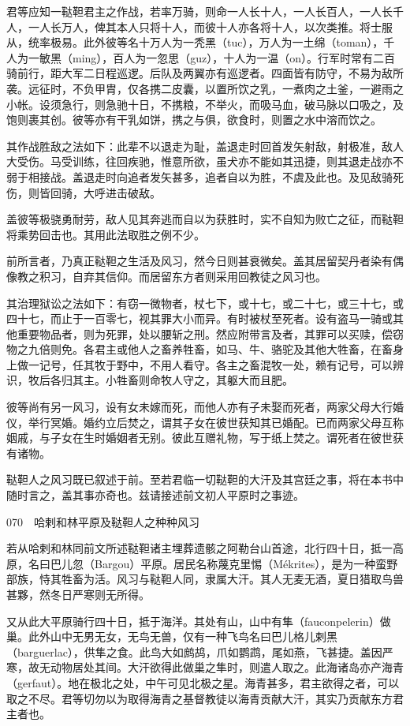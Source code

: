 \documentclass[12pt,UTF8]{ctexbook}
\begin{document}
君等应知一鞑靼君主之作战，若率万骑，则命一人长十人，一人长百人，一人长千人，一人长万人，俾其本人只将十人，而彼十人亦各将十人，以次类推。将士服从，统率极易。此外彼等名十万人为一秃黑（tuc），万人为一土绵（toman），千人为一敏黑（ming），百人为一忽思（guz），十人为一温（on）。行军时常有二百骑前行，距大军二日程巡逻。后队及两翼亦有巡逻者。四面皆有防守，不易为敌所袭。远征时，不负甲胄，仅各携二皮囊，以置所饮之乳，一煮肉之土釜，一避雨之小帐。设须急行，则急驰十日，不携粮，不举火，而吸马血，破马脉以口吸之，及饱则裹其创。彼等亦有干乳如饼，携之与俱，欲食时，则置之水中溶而饮之。

其作战胜敌之法如下：此辈不以退走为耻，盖退走时回首发矢射敌，射极准，敌人大受伤。马受训练，往回疾驰，惟意所欲，虽犬亦不能如其迅捷，则其退走战亦不弱于相接战。盖退走时向追者发矢甚多，追者自以为胜，不虞及此也。及见敌骑死伤，则皆回骑，大呼进击破敌。

盖彼等极骁勇耐劳，敌人见其奔逃而自以为获胜时，实不自知为败亡之征，而鞑靼将乘势回击也。其用此法取胜之例不少。

前所言者，乃真正鞑靼之生活及风习，然今日则甚衰微矣。盖其居留契丹者染有偶像教之积习，自弃其信仰。而居留东方者则采用回教徒之风习也。

其治理狱讼之法如下：有窃一微物者，杖七下，或十七，或二十七，或三十七，或四十七，而止于一百零七，视其罪大小而异。有时被杖至死者。设有盗马一骑或其他重要物品者，则为死罪，处以腰斩之刑。然应附带言及者，其罪可以买赎，偿窃物之九倍则免。各君主或他人之畜养牲畜，如马、牛、骆驼及其他大牲畜，在畜身上做一记号，任其牧于野中，不用人看守。各主之畜混牧一处，赖有记号，可以辨识，牧后各归其主。小牲畜则命牧人守之，其躯大而且肥。

彼等尚有另一风习，设有女未嫁而死，而他人亦有子未娶而死者，两家父母大行婚仪，举行冥婚。婚约立后焚之，谓其子女在彼世获知其已婚配。已而两家父母互称姻戚，与子女在生时婚姻者无别。彼此互赠礼物，写于纸上焚之。谓死者在彼世获有诸物。

鞑靼人之风习既已叙述于前。至若君临一切鞑靼的大汗及其宫廷之事，将在本书中随时言之，盖其事亦奇也。兹请接述前文初人平原时之事迹。





070　哈剌和林平原及鞑靼人之种种风习

若从哈剌和林同前文所述鞑靼诸主埋葬遗骸之阿勒台山首途，北行四十日，抵一高原，名曰巴儿忽（Bargou）平原。居民名称蔑克里惕（Mékrites），是为一种蛮野部族，恃其牲畜为活。风习与鞑靼人同，隶属大汗。其人无麦无酒，夏日猎取鸟兽甚夥，然冬日严寒则无所得。

又从此大平原骑行四十日，抵于海洋。其处有山，山中有隼（fauconpelerin）做巢。此外山中无男无女，无鸟无兽，仅有一种飞鸟名曰巴儿格儿剌黑（barguerlac），供隼之食。此鸟大如鹧鸪，爪如鹦鹉，尾如燕，飞甚捷。盖因严寒，故无动物居处其间。大汗欲得此做巢之隼时，则遣人取之。此海诸岛亦产海青（gerfaut）。地在极北之处，中午可见北极之星。海青甚多，君主欲得之者，可以取之不尽。君等切勿以为取得海青之基督教徒以海青贡献大汗，其实乃贡献东方君主者也。
\end{document}
